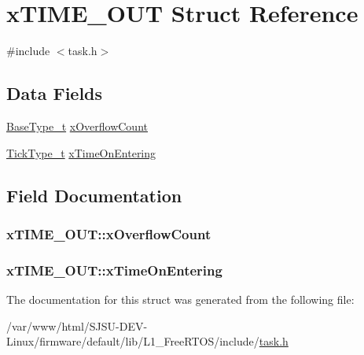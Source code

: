 \hypertarget{structxTIME__OUT}{}\section{x\+T\+I\+M\+E\+\_\+\+O\+UT Struct Reference}
\label{structxTIME__OUT}


{\ttfamily \#include $<$task.\+h$>$}

\subsection*{Data Fields}
\begin{DoxyCompactItemize}
\item 
\hyperlink{portmacro_8h_a46fb21e00ae0729d7515c0fbf2269796}{Base\+Type\+\_\+t} \hyperlink{structxTIME__OUT_a9289c6f97096a9b3e3fc705d0bc5a160}{x\+Overflow\+Count}
\item 
\hyperlink{portmacro_8h_aa69c48c6e902ce54f70886e6573c92a9}{Tick\+Type\+\_\+t} \hyperlink{structxTIME__OUT_a3464939ca050f7bcc6ffe0d8d3766337}{x\+Time\+On\+Entering}
\end{DoxyCompactItemize}


\subsection{Field Documentation}
\subsubsection[{\texorpdfstring{x\+Overflow\+Count}{xOverflowCount}}]{ x\+T\+I\+M\+E\+\_\+\+O\+U\+T\+::x\+Overflow\+Count}\hypertarget{structxTIME__OUT_a9289c6f97096a9b3e3fc705d0bc5a160}{}\label{structxTIME__OUT_a9289c6f97096a9b3e3fc705d0bc5a160}
\subsubsection[{\texorpdfstring{x\+Time\+On\+Entering}{xTimeOnEntering}}]{ x\+T\+I\+M\+E\+\_\+\+O\+U\+T\+::x\+Time\+On\+Entering}\hypertarget{structxTIME__OUT_a3464939ca050f7bcc6ffe0d8d3766337}{}\label{structxTIME__OUT_a3464939ca050f7bcc6ffe0d8d3766337}


The documentation for this struct was generated from the following file\+:\begin{DoxyCompactItemize}
\item 
/var/www/html/\+S\+J\+S\+U-\/\+D\+E\+V-\/\+Linux/firmware/default/lib/\+L1\+\_\+\+Free\+R\+T\+O\+S/include/\hyperlink{task_8h}{task.\+h}\end{DoxyCompactItemize}
